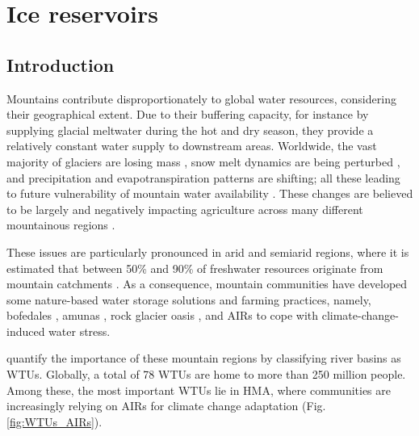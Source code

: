 \chapter{Ice reservoirs}



\section{Introduction}

Mountains contribute disproportionately to global water resources, considering their geographical extent. Due to
their buffering capacity, for instance by supplying glacial meltwater during the hot and dry season, they
provide a relatively constant water supply to downstream areas. Worldwide, the vast majority of glaciers are
losing mass \citep{zempGlobalGlacierMass2019a}, snow melt dynamics are being perturbed
\citep{mukhopadhyayReevaluationSnowmeltGlacial2015, hammondGlobalSnowZone2018}, and precipitation and
evapotranspiration patterns are shifting; all these leading to future vulnerability of mountain water
availability \citep{lutzConsistentIncreaseHigh2014}. These changes are believed to be largely and negatively
impacting agriculture across many different mountainous regions \citep{ipccCrossChapterPaperMountains2022}.

These issues are particularly pronounced in arid and semiarid regions, where it is estimated that between 50\%
and 90\% of freshwater resources originate from mountain catchments
\citep{mukhopadhyayReevaluationSnowmeltGlacial2015, messerliMountainsWorldVulnerable2004}. As a consequence,
mountain communities have developed some nature-based water storage solutions and farming practices, namely,
bofedales \citep{monge-salazarEcohydrologyEcosystemServices2022}, amunas
\citep{ochoa-tocachiPotentialContributionsPreInca2019}, rock glacier oasis \citep{pandeyRockGlacierOasis2022},
and \ac{AIRs} \citep{wangchukIceStupaCompetition2020} to cope with climate-change-induced water stress.

\citet{immerzeelImportanceVulnerabilityWorld2020} quantify the importance of these mountain regions by
classifying river basins as \ac{WTUs}. Globally, a total of 78 \ac{WTUs} are home to more than 250 million
people. Among these, the most important WTUs lie in \ac{HMA}, where communities are increasingly relying on
\ac{AIRs} for climate change adaptation (Fig. \ref{fig:WTUs_AIRs}). 

